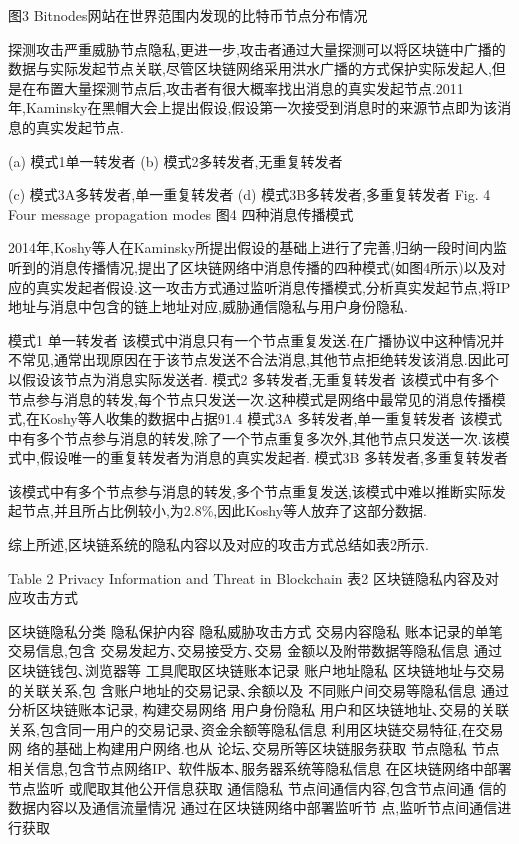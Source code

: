 图3  Bitnodes网站在世界范围内发现的比特币节点分布情况

探测攻击严重威胁节点隐私,更进一步,攻击者通过大量探测可以将区块链中广播的数据与实际发起节点关联,尽管区块链网络采用洪水广播的方式保护实际发起人,但是在布置大量探测节点后,攻击者有很大概率找出消息的真实发起节点.2011年,Kaminsky在黑帽大会上提出假设,假设第一次接受到消息时的来源节点即为该消息的真实发起节点.
 
   (a) 模式1单一转发者                        (b) 模式2多转发者,无重复转发者

 
(c) 模式3A多转发者,单一重复转发者             (d) 模式3B多转发者,多重复转发者
Fig. 4  Four message propagation modes
图4  四种消息传播模式

2014年,Koshy等人在Kaminsky所提出假设的基础上进行了完善,归纳一段时间内监听到的消息传播情况,提出了区块链网络中消息传播的四种模式(如图4所示)以及对应的真实发起者假设.这一攻击方式通过监听消息传播模式,分析真实发起节点,将IP地址与消息中包含的链上地址对应,威胁通信隐私与用户身份隐私.

模式1 单一转发者 该模式中消息只有一个节点重复发送.在广播协议中这种情况并不常见,通常出现原因在于该节点发送不合法消息,其他节点拒绝转发该消息.因此可以假设该节点为消息实际发送者.
模式2 多转发者,无重复转发者 该模式中有多个节点参与消息的转发,每个节点只发送一次.这种模式是网络中最常见的消息传播模式,在Koshy等人收集的数据中占据91.4%
模式3A 多转发者,单一重复转发者 该模式中有多个节点参与消息的转发,除了一个节点重复多次外,其他节点只发送一次.该模式中,假设唯一的重复转发者为消息的真实发起者.
模式3B 多转发者,多重复转发者 

该模式中有多个节点参与消息的转发,多个节点重复发送,该模式中难以推断实际发起节点,并且所占比例较小,为2.8\%,因此Koshy等人放弃了这部分数据.

综上所述,区块链系统的隐私内容以及对应的攻击方式总结如表2所示.

Table 2  Privacy Information and Threat in Blockchain
表2  区块链隐私内容及对应攻击方式

区块链隐私分类	隐私保护内容	隐私威胁攻击方式
交易内容隐私	账本记录的单笔交易信息,包含
交易发起方､交易接受方､交易
金额以及附带数据等隐私信息	通过区块链钱包､浏览器等
工具爬取区块链账本记录
账户地址隐私	区块链地址与交易的关联关系,包
含账户地址的交易记录､余额以及
不同账户间交易等隐私信息	通过分析区块链账本记录,
构建交易网络
用户身份隐私	用户和区块链地址､交易的关联关系,包含同一用户的交易记录､资金余额等隐私信息	利用区块链交易特征,在交易网
络的基础上构建用户网络.也从
论坛､交易所等区块链服务获取
节点隐私	节点相关信息,包含节点网络IP､
软件版本､服务器系统等隐私信息	在区块链网络中部署节点监听
或爬取其他公开信息获取
通信隐私	节点间通信内容,包含节点间通
信的数据内容以及通信流量情况	通过在区块链网络中部署监听节
点,监听节点间通信进行获取

